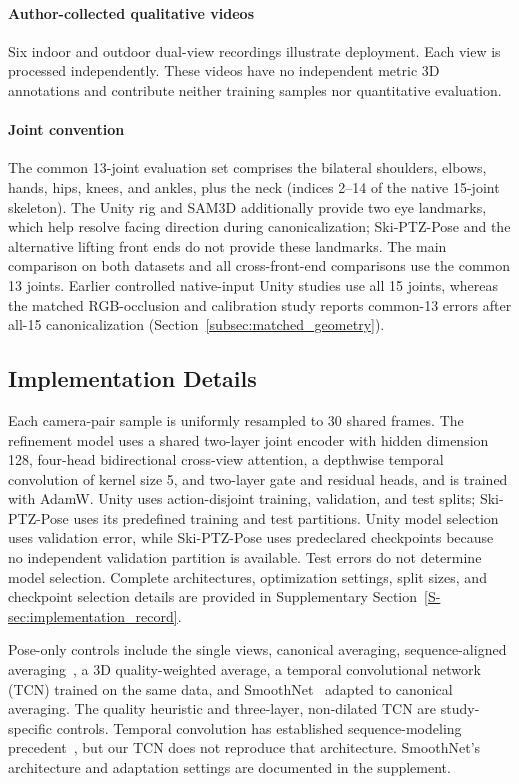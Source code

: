 \documentclass[preprint,12pt]{elsarticle}
\begin{document}
\paragraph{Author-collected qualitative videos}
Six indoor and outdoor dual-view recordings illustrate deployment. Each view is processed independently. These videos have no independent metric 3D annotations and contribute neither training samples nor quantitative evaluation.

\paragraph{Joint convention}
The common 13-joint evaluation set comprises the bilateral shoulders, elbows, hands, hips, knees, and ankles, plus the neck (indices 2--14 of the native 15-joint skeleton). The Unity rig and SAM3D additionally provide two eye landmarks, which help resolve facing direction during canonicalization; Ski-PTZ-Pose and the alternative lifting front ends do not provide these landmarks. The main comparison on both datasets and all cross-front-end comparisons use the common 13 joints. Earlier controlled native-input Unity studies use all 15 joints, whereas the matched RGB-occlusion and calibration study reports common-13 errors after all-15 canonicalization (Section~\ref{subsec:matched_geometry}).

\subsection{Implementation Details}
\label{subsec:implementation_details}

Each camera-pair sample is uniformly resampled to 30 shared frames. The refinement model uses a shared two-layer joint encoder with hidden dimension 128, four-head bidirectional cross-view attention, a depthwise temporal convolution of kernel size 5, and two-layer gate and residual heads, and is trained with AdamW. Unity uses action-disjoint training, validation, and test splits; Ski-PTZ-Pose uses its predefined training and test partitions. Unity model selection uses validation error, while Ski-PTZ-Pose uses predeclared checkpoints because no independent validation partition is available. Test errors do not determine model selection. Complete architectures, optimization settings, split sizes, and checkpoint selection details are provided in Supplementary Section~\ref{S-sec:implementation_record}.

Pose-only controls include the single views, canonical averaging, sequence-aligned averaging~\cite{umeyama1991least}, a 3D quality-weighted average, a temporal convolutional network (TCN) trained on the same data, and SmoothNet~\cite{zeng2022smoothnet} adapted to canonical averaging. The quality heuristic and three-layer, non-dilated TCN are study-specific controls. Temporal convolution has established sequence-modeling precedent~\cite{bai2018empirical}, but our TCN does not reproduce that architecture. SmoothNet's architecture and adaptation settings are documented in the supplement.
\end{document}
